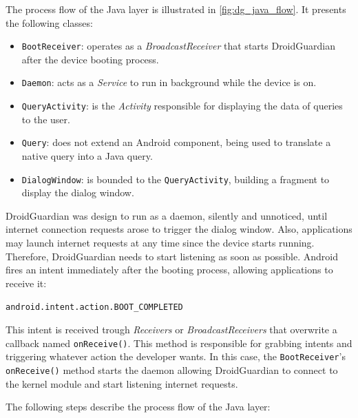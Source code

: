 The process flow of the Java layer is illustrated in \autoref{fig:dg_java_flow}. It presents the following classes:

\begin{itemize}
\item \texttt{BootReceiver}: operates as a \textit{BroadcastReceiver} that starts DroidGuardian after the device booting process.
\item \texttt{Daemon}: acts as a \textit{Service} to run in background while the device is on.
\item \texttt{QueryActivity}: is the \textit{Activity} responsible for displaying the data of queries to the user.
\item \texttt{Query}: does not extend an Android component, being used to translate a native query into a Java query.
\item \texttt{DialogWindow}: is bounded to the \texttt{QueryActivity}, building a fragment to display the dialog window.
\end{itemize}

DroidGuardian was design to run as a daemon, silently and unnoticed, until internet connection requests arose to trigger the dialog window.  Also, applications may launch internet requests at any time since the device starts running. Therefore, DroidGuardian needs to start listening as soon as possible. Android fires an intent immediately after the booting process, allowing applications to receive it:

\indent \texttt{android.intent.action.BOOT\_COMPLETED}

This intent is received trough \textit{Receivers} or \textit{BroadcastReceivers} that overwrite a callback named \texttt{onReceive()}. This method is responsible for grabbing intents and triggering whatever action the developer wants. In this case, the \texttt{BootReceiver}'s \texttt{onReceive()} method starts the daemon allowing DroidGuardian to connect to the kernel module and start listening internet requests.

The following steps describe the process flow of the Java layer:

